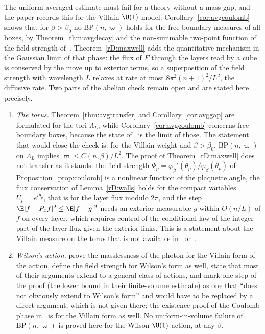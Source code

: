 \begin{remark}\label{rD:abelian}
The uniform averaged estimate must fail for a theory without a mass gap,
and the paper records this for the Villain $\U(1)$ model:
Corollary~\ref{cor:avgcoulomb} shows that for $\beta>\beta_0$ no
$\mathrm{BP}(n,\varpi)$ holds for the free-boundary measures of all boxes,
by Theorem~\ref{thm:avgdecay} and the non-summable two-point function of
the field strength of~\cite[Sect.~2]{FS82}. Theorem~\ref{rD:maxwell} adds
the quantitative mechanism in the Gaussian limit of that phase: the flux of
$F$ through the layers read by a cube is conserved by the move up to
exterior terms, so a superposition of the field strength with wavelength
$L$ relaxes at rate at most $8\pi^2(n+1)^2/L^2$, the diffusive rate. Two
parts of the abelian check remain open and are stated here precisely.
\begin{enumerate}[label=\textup{(\alph*)},leftmargin=*]
\item \emph{The torus.} Theorem~\ref{thm:avgtransfer} and
Corollary~\ref{cor:avggap} are formulated for the tori $\Lambda_L$, while
Corollary~\ref{cor:avgcoulomb} concerns free-boundary boxes, because the
state of~\cite{FS82} is the limit of those. The statement that would close
the check is: for the Villain weight and $\beta>\beta_0$, $\mathrm{BP}(n,
\varpi)$ on $\Lambda_L$ implies $\varpi\le C(n,\beta)/L^2$. The proof of
Theorem~\ref{rD:maxwell} does not transfer as it stands: the field
strength $\Psi_p=\varphi_\beta'(\theta_p)/\varphi_\beta(\theta_p)$ of
Proposition~\ref{prop:coulomb} is a nonlinear function of the plaquette
angle, the flux conservation of Lemma~\ref{rD:walls} holds for the compact
variables $U_p=e^{i\theta_p}$, that is for the layer flux modulo $2\pi$,
and the step $\E\lvert f-P_xf\rvert^2\le\E\lvert f-g\rvert^2$ needs an
exterior-measurable $g$ within $O(n/L)$ of $f$ on every layer, which
requires control of the conditional law of the integer part of the layer
flux given the exterior links. This is a statement about the Villain
measure on the torus that is not available in~\cite{FS82} or~\cite{Gut80}.
\item \emph{Wilson's action.} \cite[Sect.~2.11]{FS82} prove the
masslessness of the photon for the Villain form of the action, define the
field strength for Wilson's form as well, state that most of their arguments
extend to a general class of actions, and mark one step of the proof (the
lower bound in their finite-volume estimate) as one that ``does not obviously
extend to Wilson's form'' and would have to be replaced by a direct
argument, which is not given there; the existence proof of the Coulomb
phase in~\cite{Gut80} is for the Villain form as well. No uniform-in-volume
failure of $\mathrm{BP}(n,\varpi)$ is proved here for the Wilson $\U(1)$
action, at any $\beta$.
\end{enumerate}
\end{remark}

